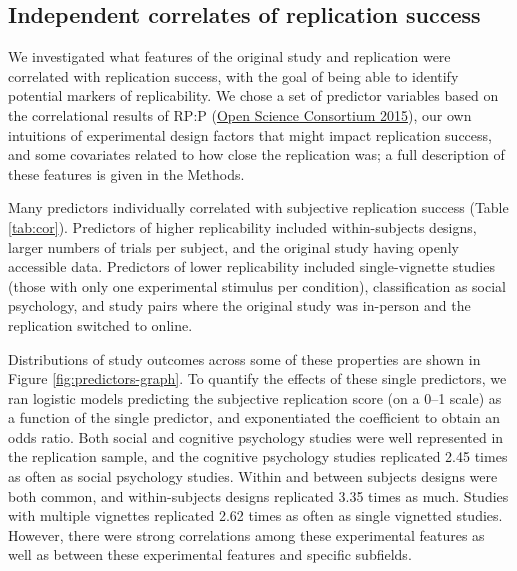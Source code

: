 \documentclass[
  english,
  a4paper,
]{article}
\begin{document}
\hypertarget{independent-correlates-of-replication-success}{%
\subsection{Independent correlates of replication success}\label{independent-correlates-of-replication-success}}

We investigated what features of the original study and replication were correlated with replication success, with the goal of being able to identify potential markers of replicability. We chose a set of predictor variables based on the correlational results of RP:P (\protect\hyperlink{ref-openscienceconsortium2015}{Open Science Consortium 2015}), our own intuitions of experimental design factors that might impact replication success, and some covariates related to how close the replication was; a full description of these features is given in the Methods.

Many predictors individually correlated with subjective replication success (Table \ref{tab:cor}). Predictors of higher replicability included within-subjects designs, larger numbers of trials per subject, and the original study having openly accessible data. Predictors of lower replicability included single-vignette studies (those with only one experimental stimulus per condition), classification as social psychology, and study pairs where the original study was in-person and the replication switched to online.

Distributions of study outcomes across some of these properties are shown in Figure \ref{fig:predictors-graph}. To quantify the effects of these single predictors, we ran logistic models predicting the subjective replication score (on a 0--1 scale) as a function of the single predictor, and exponentiated the coefficient to obtain an odds ratio. Both social and cognitive psychology studies were well represented in the replication sample, and the cognitive psychology studies replicated 2.45 times as often as social psychology studies. Within and between subjects designs were both common, and within-subjects designs replicated 3.35 times as much. Studies with multiple vignettes replicated 2.62 times as often as single vignetted studies. However, there were strong correlations among these experimental features as well as between these experimental features and specific subfields.
\end{document}
